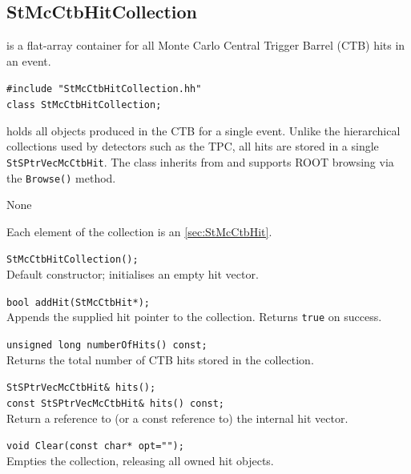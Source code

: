 %
%
\subsection{StMcCtbHitCollection}
 
\label{sec:StMcCtbHitCollection}
\begin{Entry}
\item[Summary]
     is a flat-array container for all Monte Carlo
    Central Trigger Barrel (CTB) hits in an event.

\item[Synopsis]
    \verb+#include "StMcCtbHitCollection.hh"+\\
    \verb+class StMcCtbHitCollection;+\\

\item[Description]
     holds all  objects produced
    in the CTB for a single event.  Unlike the hierarchical collections used
    by detectors such as the TPC, all hits are stored in a single
    \verb+StSPtrVecMcCtbHit+.  The class inherits from  and
    supports ROOT browsing via the \verb+Browse()+ method.

\item[Persistence]
    None

\item[Related Classes]
    Each element of the collection is an 
    \ref{sec:StMcCtbHit}.

\item[Public\\ Constructors]
    \verb+StMcCtbHitCollection();+\\
    Default constructor; initialises an empty hit vector.

\item[Public Member\\ Functions]
    \verb+bool addHit(StMcCtbHit*);+\\
    Appends the supplied hit pointer to the collection.
    Returns \verb+true+ on success.

    \verb+unsigned long numberOfHits() const;+\\
    Returns the total number of CTB hits stored in the collection.

    \verb+StSPtrVecMcCtbHit& hits();+\\
    \verb+const StSPtrVecMcCtbHit& hits() const;+\\
    Return a reference to (or a const reference to) the internal hit vector.

    \verb+void Clear(const char* opt="");+\\
    Empties the collection, releasing all owned hit objects.

\end{Entry}
\clearpage
%
%
